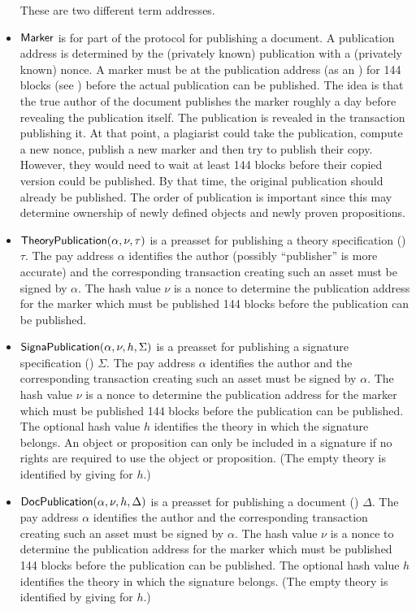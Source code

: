 \begin{itemize}
These are two different term addresses.
\item ${\constr{Marker}}$ is for part of the protocol for publishing a document.
A publication address is determined by the (privately known) publication with a (privately known) nonce.
A marker must be at the publication address (as an {})
for 144 blocks (see {}) before the actual publication can be published.
The idea is that the true author of the document publishes the marker roughly a day before
revealing the publication itself. The publication is revealed in the transaction publishing it.
At that point, a plagiarist could take the publication, compute a new nonce, publish a new marker
and then try to publish their copy. However, they would need to wait at least 144 blocks before their
copied version could be published. By that time, the original publication should already be published.
The order of publication is important since this may determine ownership of
newly defined objects and newly proven propositions.
\item ${\constr{TheoryPublication}}(\alpha,\nu,\tau)$ is a preasset
for publishing a theory specification ({}) $\tau$.
The pay address $\alpha$ identifies the author (possibly ``publisher'' is more accurate)
and the corresponding transaction
creating such an asset must be signed by $\alpha$.
The hash value $\nu$ is a nonce to determine the publication address for the marker
which must be published 144 blocks before the publication can be published.
\item ${\constr{SignaPublication}}(\alpha,\nu,h,\Sigma)$ is a preasset
for publishing a signature specification ({}) $\Sigma$.
The pay address $\alpha$ identifies the author and the corresponding transaction
creating such an asset must be signed by $\alpha$.
The hash value $\nu$ is a nonce to determine the publication address for the marker
which must be published 144 blocks before the publication can be published.
The optional hash value $h$ identifies the theory in which the signature belongs.
An object or proposition can only be included in a signature if no rights are required
to use the object or proposition.
(The empty theory is identified by giving {} for $h$.)
\item ${\constr{DocPublication}}(\alpha,\nu,h,\Delta)$ is a preasset
for publishing a document ({}) $\Delta$.
The pay address $\alpha$ identifies the author and the corresponding transaction
creating such an asset must be signed by $\alpha$.
The hash value $\nu$ is a nonce to determine the publication address for the marker
which must be published 144 blocks before the publication can be published.
The optional hash value $h$ identifies the theory in which the signature belongs.
(The empty theory is identified by giving {} for $h$.)
\end{itemize}

